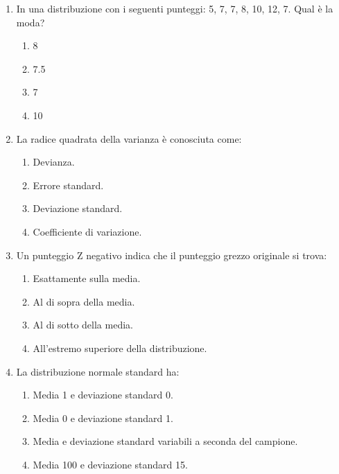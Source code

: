 \documentclass[12pt, a4paper]{article}
\begin{document}
\begin{enumerate}[resume]
    \item In una distribuzione con i seguenti punteggi: 5, 7, 7, 8, 10, 12, 7. Qual è la moda?
    \begin{enumerate}
        \item 8
        \item 7.5
        \item 7
        \item 10
    \end{enumerate}
    \vspace{0.3cm}

    \item La radice quadrata della varianza è conosciuta come:
    \begin{enumerate}
        \item Devianza.
        \item Errore standard.
        \item Deviazione standard.
        \item Coefficiente di variazione.
    \end{enumerate}
    \vspace{0.3cm}

    \item Un punteggio Z negativo indica che il punteggio grezzo originale si trova:
    \begin{enumerate}
        \item Esattamente sulla media.
        \item Al di sopra della media.
        \item Al di sotto della media.
        \item All'estremo superiore della distribuzione.
    \end{enumerate}
    \vspace{0.3cm}

    \item La distribuzione normale standard ha:
    \begin{enumerate}
        \item Media 1 e deviazione standard 0.
        \item Media 0 e deviazione standard 1.
        \item Media e deviazione standard variabili a seconda del campione.
        \item Media 100 e deviazione standard 15.
    \end{enumerate}
    \vspace{0.3cm}


\end{enumerate}
\end{document}
